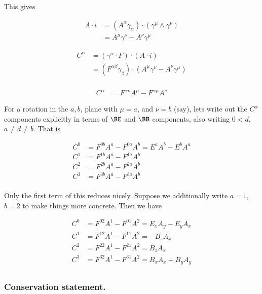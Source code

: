 \documentclass{article}
\begin{document}
This gives

\begin{align*}
A \cdot i 
&= (A^\alpha \gamma_\alpha) \cdot (\gamma^{\mu} \wedge \gamma^{\nu}) \\
&= A^\mu \gamma^\nu - A^\nu \gamma^\mu
\end{align*}

\begin{align*}
C^\alpha 
&= (\gamma^\alpha \cdot F) \cdot (A \cdot i) \\
&= ( F^{\alpha\beta} \gamma_\beta ) \cdot ( A^\mu \gamma^\nu - A^\nu \gamma^\mu) \\
\end{align*}

\begin{align}\label{eqn:conservedCurrentGeneralIndexes}
C^\alpha 
&= F^{\alpha\nu} A^\mu - F^{\alpha\mu} A^\nu 
\end{align}

For a rotation in the $a,b$, plane with $\mu = a$, and $\nu = b$ (say), lets write out the $C^\alpha$ components explicitly in terms of $\BE$ and $\BB$ components, also
writing $0 < d$, $a \ne d \ne b$.  That is

\begin{align*}
C^0 &= F^{0 b} A^a - F^{0 a} A^b = E^a A^b - E^b A^a \\
C^1 &= F^{1 b} A^a - F^{1 a} A^b \\
C^2 &= F^{2 b} A^a - F^{2 a} A^b \\
C^3 &= F^{3 b} A^a - F^{3 a} A^b \\
\end{align*}

Only the first term of this reduces nicely.  Suppose we additionally write $a = 1$, $b = 2$ to make things more concrete.  Then we have

\begin{align*}
C^0 &= F^{0 2} A^1 - F^{0 1} A^2 = E_x A_y - E_y A_x \\
C^1 &= F^{1 2} A^1 - F^{1 1} A^2 = -B_z A_x \\
C^2 &= F^{2 2} A^1 - F^{2 1} A^2 = B_z A_x \\
C^3 &= F^{3 2} A^1 - F^{3 1} A^2 = B_x A_x + B_y A_y \\
\end{align*}

\subsubsection{ Conservation statement. }
\end{document}
